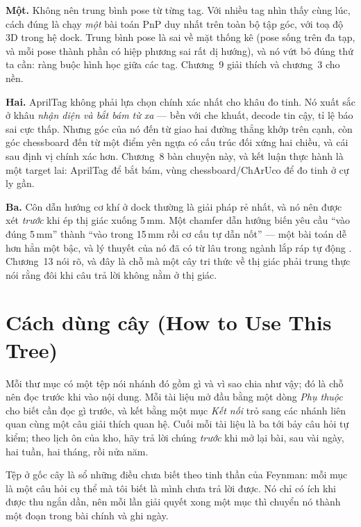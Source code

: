\documentclass[marker.tex]{subfiles}
\begin{document}
\textbf{Một.} Không nên trung bình pose từ từng tag. Với nhiều tag nhìn thấy cùng lúc, cách đúng là chạy \emph{một} bài toán PnP duy nhất trên toàn bộ tập góc, với toạ độ 3D trong hệ dock. Trung bình pose là sai về mặt thống kê (pose sống trên đa tạp, và mỗi pose thành phần có hiệp phương sai rất dị hướng), và nó vứt bỏ đúng thứ ta cần: ràng buộc hình học giữa các tag. Chương~9 giải thích và chương~3 cho nền.

\textbf{Hai.} AprilTag không phải lựa chọn chính xác nhất cho khâu đo tinh. Nó xuất sắc ở khâu \emph{nhận diện và bắt bám từ xa} --- bền với che khuất, decode tin cậy, tỉ lệ báo sai cực thấp. Nhưng góc của nó đến từ giao hai đường thẳng khớp trên cạnh, còn góc chessboard đến từ một điểm yên ngựa có cấu trúc đối xứng hai chiều, và cái sau định vị chính xác hơn. Chương~8 bàn chuyện này, và kết luận thực hành là một target lai: AprilTag để bắt bám, vùng chessboard/ChArUco để đo tinh ở cự ly gần.

\textbf{Ba.} Côn dẫn hướng cơ khí ở dock thường là giải pháp rẻ nhất, và nó nên được xét \emph{trước} khi ép thị giác xuống 5\,mm. Một chamfer dẫn hướng biến yêu cầu ``vào đúng 5\,mm'' thành ``vào trong 15\,mm rồi cơ cấu tự dẫn nốt'' --- một bài toán dễ hơn hẳn một bậc, và lý thuyết của nó đã có từ lâu trong ngành lắp ráp tự động \cite{whitney1982quasi}. Chương~13 nói rõ, và đây là chỗ mà một cây tri thức về thị giác phải trung thực nói rằng đôi khi câu trả lời không nằm ở thị giác.

\section*{Cách dùng cây (How to Use This Tree)}

Mỗi thư mục có một tệp  nói nhánh đó gồm gì và vì sao chia như vậy; đó là chỗ nên đọc trước khi vào nội dung. Mỗi tài liệu mở đầu bằng một dòng \emph{Phụ thuộc} cho biết cần đọc gì trước, và kết bằng một mục \emph{Kết nối} trỏ sang các nhánh liên quan cùng một câu giải thích quan hệ. Cuối mỗi tài liệu là ba tới bảy câu hỏi tự kiểm; theo lịch ôn của kho, hãy trả lời chúng \emph{trước} khi mở lại bài, sau vài ngày, hai tuần, hai tháng, rồi nửa năm.

Tệp  ở gốc cây là sổ những điều chưa biết theo tinh thần của Feynman: mỗi mục là một câu hỏi cụ thể mà tôi biết là mình chưa trả lời được. Nó chỉ có ích khi được thu ngắn dần, nên mỗi lần giải quyết xong một mục thì chuyển nó thành một đoạn trong bài chính và ghi ngày.
\end{document}
